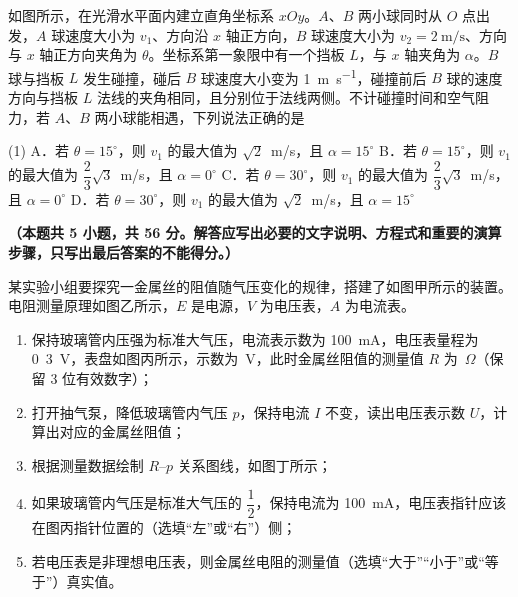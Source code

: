 \begin{question}
如图所示，在光滑水平面内建立直角坐标系 $xOy$。$A$、$B$ 两小球同时从 $O$ 点出发，$A$ 球速度大小为 $v_{1}$、方向沿 $x$ 轴正方向，$B$ 球速度大小为 $v_{2}=\SI{2}{\metre\per\second}$、方向与 $x$ 轴正方向夹角为 $\theta$。坐标系第一象限中有一个挡板 $L$，与 $x$ 轴夹角为 $\alpha$。$B$ 球与挡板 $L$ 发生碰撞，碰后 $B$ 球速度大小变为 \SI{1}{\metre\per\second}，碰撞前后 $B$ 球的速度方向与挡板 $L$ 法线的夹角相同，且分别位于法线两侧。不计碰撞时间和空气阻力，若 $A$、$B$ 两小球能相遇，下列说法正确的是\gkblank


\begin{gkopts}(1)
  \task A．若 $\theta=15^{\circ}$，则 $v_{1}$ 的最大值为 $\sqrt{2}$~m/s，且 $\alpha=15^{\circ}$
  \task B．若 $\theta=15^{\circ}$，则 $v_{1}$ 的最大值为 $\dfrac{2}{3}\sqrt{3}$~m/s，且 $\alpha=0^{\circ}$
  \task C．若 $\theta=30^{\circ}$，则 $v_{1}$ 的最大值为 $\dfrac{2}{3}\sqrt{3}$~m/s，且 $\alpha=0^{\circ}$
  \task D．若 $\theta=30^{\circ}$，则 $v_{1}$ 的最大值为 $\sqrt{2}$~m/s，且 $\alpha=15^{\circ}$
\end{gkopts}
\end{question}


\textbf{（本题共 5 小题，共 56 分。解答应写出必要的文字说明、方程式和重要的演算步骤，只写出最后答案的不能得分。）}

\begin{question}
某实验小组要探究一金属丝的阻值随气压变化的规律，搭建了如图甲所示的装置。电阻测量原理如图乙所示，$E$ 是电源，$V$ 为电压表，$A$ 为电流表。



\begin{enumerate}[leftmargin=2em, label=(\arabic*)]
  \item 保持玻璃管内压强为标准大气压，电流表示数为 \SI{100}{\milli\ampere}，电压表量程为 0~3~V，表盘如图丙所示，示数为\gkblank~V，此时金属丝阻值的测量值 $R$ 为\gkblank~$\Omega$（保留 3 位有效数字）；
  \item 打开抽气泵，降低玻璃管内气压 $p$，保持电流 $I$ 不变，读出电压表示数 $U$，计算出对应的金属丝阻值；
  \item 根据测量数据绘制 $R$--$p$ 关系图线，如图丁所示；
  \item 如果玻璃管内气压是标准大气压的 $\dfrac{1}{2}$，保持电流为 \SI{100}{\milli\ampere}，电压表指针应该在图丙指针位置的\gkblank（选填“左”或“右”）侧；
  \item 若电压表是非理想电压表，则金属丝电阻的测量值\gkblank（选填“大于”“小于”或“等于”）真实值。
\end{enumerate}


\end{question}

